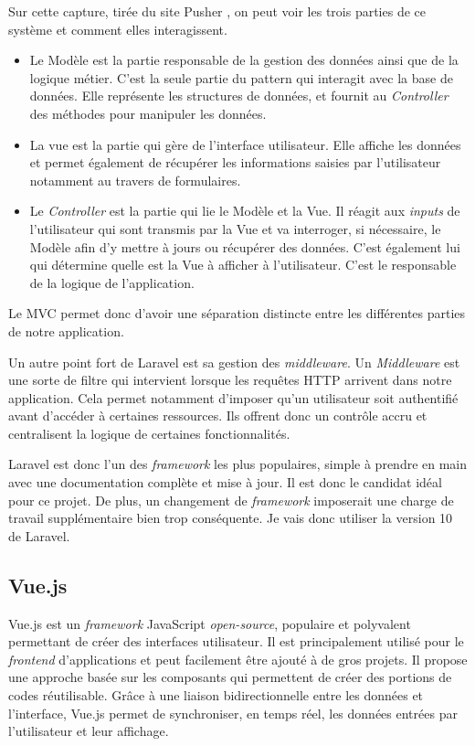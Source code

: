 Sur cette capture, tirée du site Pusher \cite{MVC}, on peut voir les trois parties de ce système et comment elles interagissent.
\begin{itemize}
    \item Le Modèle est la partie responsable de la gestion des données ainsi que de la logique métier. C'est la seule partie du pattern qui interagit avec la base de données. Elle représente les structures de données, et fournit au \emph{Controller} des méthodes pour manipuler les données.
    \item La vue est la partie qui gère de l'interface utilisateur. Elle affiche les données et permet également de récupérer les informations saisies par l'utilisateur notamment au travers de formulaires.
    \item Le \emph{Controller} est la partie qui lie le Modèle et la Vue. Il réagit aux \emph{inputs} de l'utilisateur qui sont transmis par la Vue et va interroger, si nécessaire, le Modèle afin d'y mettre à jours ou récupérer des données. C'est également lui qui détermine quelle est la Vue à afficher à l'utilisateur. C'est le responsable de la logique de l'application.
\end{itemize}
Le MVC permet donc d'avoir une séparation distincte entre les différentes parties de notre application.

Un autre point fort de Laravel est sa gestion des \emph{middleware}. Un \emph{Middleware} est une sorte de filtre qui intervient lorsque les requêtes HTTP arrivent dans notre application. Cela permet notamment d'imposer qu'un utilisateur soit authentifié avant d'accéder à certaines ressources. Ils offrent donc un contrôle accru et centralisent la logique de certaines fonctionnalités.

Laravel est donc l'un des \emph{framework} les plus populaires, simple à prendre en main avec une documentation complète et mise à jour. Il est donc le candidat idéal pour ce projet. De plus, un changement de \emph{framework} imposerait une charge de travail supplémentaire bien trop conséquente.
Je vais donc utiliser la version 10 de Laravel.

\subsection{Vue.js}
Vue.js est un \emph{framework} JavaScript \emph{open-source}, populaire et polyvalent permettant de créer des interfaces utilisateur. Il est principalement utilisé pour le \emph{frontend} d'applications et peut facilement être ajouté à de gros projets. Il propose une approche basée sur les composants qui permettent de créer des portions de codes réutilisable. Grâce à une liaison bidirectionnelle entre les données et l'interface, Vue.js permet de synchroniser, en temps réel, les données entrées par l'utilisateur et leur affichage.

